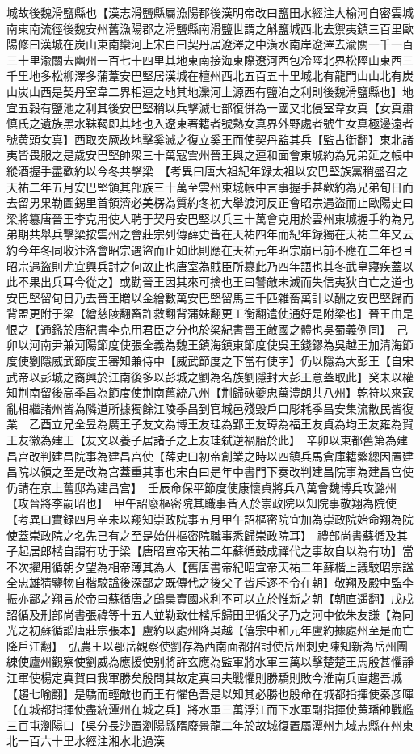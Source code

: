 城故後魏滑鹽縣也【漢志滑鹽縣屬漁陽郡後漢明帝改曰鹽田水經注大榆河自密雲城南東南流徑後魏安州舊漁陽郡之滑鹽縣南滑鹽世謂之斛鹽城西北去禦夷鎮三百里歐陽修曰漢城在炭山東南欒河上宋白曰契丹居遼澤之中潢水南岸遼澤去渝關一千一百三十里渝關去幽州一百七十四里其地東南接海東際遼河西包冷陘北界松陘山東西三千里地多松柳澤多蒲葦安巴堅居漢城在檀州西北五百五十里城北有龍門山山北有炭山炭山西是契丹室韋二界相連之地其地灤河上源西有鹽泊之利則後魏滑鹽縣也】地宜五穀有鹽池之利其後安巴堅稍以兵擊滅七部復併為一國又北侵室韋女真【女真肅慎氏之遺族黑水靺鞨即其地也入遼東著籍者號熟女真界外野處者號生女真極邊遠者號黄頭女真】西取突厥故地擊奚滅之復立奚王而使契丹監其兵【監古衘翻】東北諸夷皆畏服之是歲安巴堅帥衆三十萬寇雲州晉王與之連和面會東城約為兄弟延之帳中縱酒握手盡歡約以今冬共擊梁　【考異曰唐大祖紀年録太祖以安巴堅族黨稍盛召之天祐二年五月安巴堅領其部族三十萬至雲州東城帳中言事握手甚歡約為兄弟旬日而去留男果勒圖錫里首領濟必美楞為質約冬初大舉渡河反正會昭宗遇盜而止歐陽史曰梁將簒唐晉王李克用使人聘于契丹安巴堅以兵三十萬會克用於雲州東城握手約為兄弟期共舉兵擊梁按雲州之會莊宗列傳薛史皆在天祐四年而紀年録獨在天祐二年又云約今年冬同收汴洛會昭宗遇盜而止如此則應在天祐元年昭宗崩已前不應在二年也且昭宗遇盜則尤宜興兵討之何故止也唐室為賊臣所簒此乃四年語也其冬武皇寢疾蓋以此不果出兵耳今從之】或勸晉王因其來可擒也王曰讐敵未滅而失信夷狄自亡之道也安巴堅留旬日乃去晉王贈以金繒數萬安巴堅留馬三千匹雜畜萬計以酬之安巴堅歸而背盟更附于梁【繒慈陵翻畜許救翻背蒲妹翻更工衡翻遣使通好是附梁也】晉王由是恨之【通鑑於唐紀書李克用君臣之分也於梁紀書晉王敵國之體也吳蜀義例同】　己卯以河南尹兼河陽節度使張全義為魏王鎮海鎮東節度使吳王錢鏐為吳越王加清海節度使劉隱威武節度王審知兼侍中【威武節度之下當有使字】仍以隱為大彭王【自宋武帝以彭城之裔興於江南後多以彭城之劉為名族劉隱封大彭王意蓋取此】癸未以權知荆南留後高季昌為節度使荆南舊統八州【荆歸硤夔忠萬澧朗共八州】乾符以來寇亂相繼諸州皆為隣道所據獨餘江陵季昌到官城邑殘毁戶口彫耗季昌安集流散民皆復業　乙酉立兄全昱為廣王子友文為博王友珪為郢王友璋為福王友貞為均王友雍為賀王友徽為建王【友文以養子居諸子之上友珪弑逆禍胎於此】　辛卯以東都舊第為建昌宫改判建昌院事為建昌宫使【薛史曰初帝創業之時以四鎮兵馬倉庫籍繁總因置建昌院以領之至是改為宫蓋重其事也宋白曰是年中書門下奏改判建昌院事為建昌宫使仍請在京上舊邸為建昌宫】　壬辰命保平節度使康懷貞將兵八萬會魏博兵攻潞州【攻晉將李嗣昭也】　甲午詔廢樞密院其職事皆入於崇政院以知院事敬翔為院使　【考異曰實録四月辛未以翔知崇政院事五月甲午詔樞密院宜加為崇政院始命翔為院使蓋崇政院之名先已有之至是始併樞密院職事悉歸崇政院耳】　禮部尚書蘇循及其子起居郎楷自謂有功于梁【唐昭宣帝天祐二年蘇循鼓成禪代之事故自以為有功】當不次擢用循朝夕望為相帝薄其為人【舊唐書帝紀昭宣帝天祐二年蘇楷上議駮昭宗諡全忠雄猜鑒物自楷駮諡後深鄙之既傳代之後父子皆斥逐不令在朝】敬翔及殿中監李振亦鄙之翔言於帝曰蘇循唐之䲭梟賣國求利不可以立於惟新之朝【朝直遥翻】戊戍詔循及刑部尚書張禕等十五人並勒致仕楷斥歸田里循父子乃之河中依朱友謙【為同光之初蘇循謟唐莊宗張本】盧約以處州降吳越【僖宗中和元年盧約據處州至是而亡降戶江翻】　弘農王以鄂岳觀察使劉存為西南面都招討使岳州刺史陳知新為岳州團練使廬州觀察使劉威為應援使别將許玄應為監軍將水軍三萬以擊楚楚王馬殷甚懼靜江軍使楊定真賀曰我軍勝矣殷問其故定真曰夫戰懼則勝驕則敗今淮南兵直趨吾城【趨七喻翻】是驕而輕敵也而王有懼色吾是以知其必勝也殷命在城都指揮使秦彦暉【在城都指揮使盡統潭州在城之兵】將水軍三萬浮江而下水軍副指揮使黄璠帥戰艦三百屯瀏陽口【吳分長沙置瀏陽縣隋廢景龍二年於故城復置屬潭州九域志縣在州東北一百六十里水經注湘水北過漢